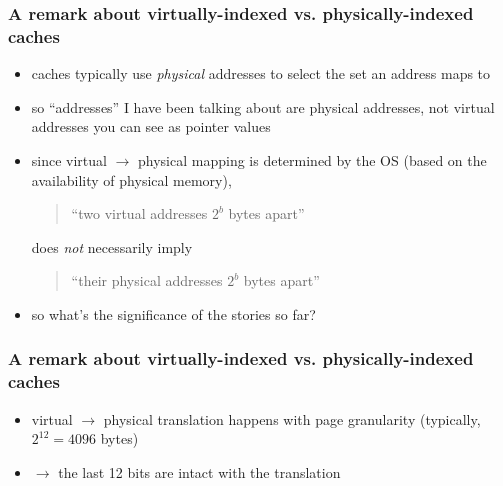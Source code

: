 \documentclass[12pt,dvipdfmx]{beamer}
\newcommand{\ao}[1]{{\color{blue}#1}}
\newcommand{\aka}[1]{{\color{red}#1}}
\begin{document}
\begin{frame}
  \frametitle{A remark about virtually-indexed vs. physically-indexed caches}
  \begin{itemize}
  \item caches typically use \ao{\it physical}
    addresses to select the set an address maps to
  \item so ``addresses'' I have been talking about are
    physical addresses, not virtual addresses you can see as pointer values

\begin{center}
\def\svgwidth{0.7\textwidth}
{\tiny}
\end{center}
    
  \item since virtual $\rightarrow$ physical mapping is determined by
    the OS (based on the availability of physical memory),
    \begin{quote}
    ``two virtual addresses $2^{b}$ bytes apart''
    \end{quote}
    does \aka{\it not} necessarily imply
    \begin{quote}
      ``their physical addresses $2^{b}$ bytes apart''
    \end{quote}
  \item so what's the significance of the stories so far?
  \end{itemize}
\end{frame}

\begin{frame}
  \frametitle{A remark about virtually-indexed vs. physically-indexed caches}
  \begin{itemize}
  \item virtual $\rightarrow$ physical translation happens
    with page granularity (typically, $2^{12} = 4096$ bytes)
  \item $\rightarrow$ the last 12 bits are intact with the translation

  \begin{center}
\def\svgwidth{0.7\textwidth}
{\tiny}
\end{center}

\end{itemize}
\end{frame}
\end{document}
